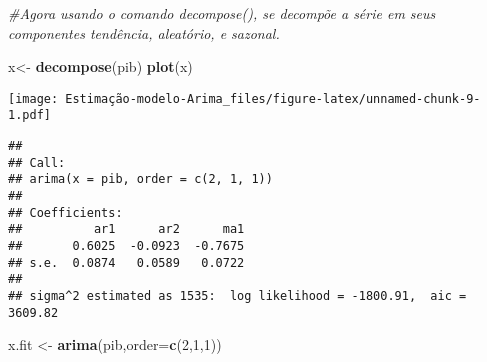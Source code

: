 \documentclass[]{article}
\newenvironment{Shaded}{\begin{snugshade}}{\end{snugshade}}
\newcommand{\CommentTok}[1]{\textcolor[rgb]{0.56,0.35,0.01}{\textit{#1}}}
\newcommand{\DataTypeTok}[1]{\textcolor[rgb]{0.13,0.29,0.53}{#1}}
\newcommand{\DecValTok}[1]{\textcolor[rgb]{0.00,0.00,0.81}{#1}}
\newcommand{\KeywordTok}[1]{\textcolor[rgb]{0.13,0.29,0.53}{\textbf{#1}}}
\newcommand{\NormalTok}[1]{#1}
\newcommand{\StringTok}[1]{\textcolor[rgb]{0.31,0.60,0.02}{#1}}
\begin{document}
\begin{Shaded}
\begin{Highlighting}[]
\CommentTok{#Agora usando o comando decompose(), se decompõe a série em seus componentes tendência, aleatório, e sazonal.}

\NormalTok{x<-}\StringTok{ }\KeywordTok{decompose}\NormalTok{(pib)}
\KeywordTok{plot}\NormalTok{(x)}
\end{Highlighting}
\end{Shaded}

\texttt{[image: Estimação-modelo-Arima\_files/figure-latex/unnamed-chunk-9-1.pdf]}

\begin{Shaded}
\end{Shaded}

\begin{verbatim}
## 
## Call:
## arima(x = pib, order = c(2, 1, 1))
## 
## Coefficients:
##          ar1      ar2      ma1
##       0.6025  -0.0923  -0.7675
## s.e.  0.0874   0.0589   0.0722
## 
## sigma^2 estimated as 1535:  log likelihood = -1800.91,  aic = 3609.82
\end{verbatim}

\begin{Shaded}
\begin{Highlighting}[]
\NormalTok{x.fit <-}\StringTok{ }\KeywordTok{arima}\NormalTok{(pib,}\DataTypeTok{order=}\KeywordTok{c}\NormalTok{(}\DecValTok{2}\NormalTok{,}\DecValTok{1}\NormalTok{,}\DecValTok{1}\NormalTok{)) }
\end{Highlighting}
\end{Shaded}

\begin{Shaded}
\end{Shaded}
\end{document}
